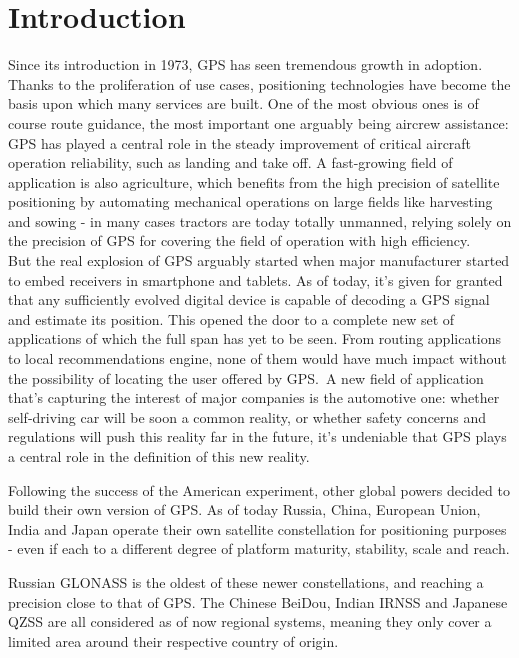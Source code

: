 \chapter{Introduction}
\label{introduction}


Since its introduction in 1973, GPS has seen tremendous growth in adoption.
Thanks to the proliferation of use cases, positioning technologies have become
the basis upon which many services are built. One of the most obvious ones is of
course route guidance, the most important one arguably being aircrew assistance:
GPS has played a central role in the steady improvement of critical aircraft
operation reliability, such as landing and take off. A fast-growing field of
application is also agriculture, which benefits from the high precision of
satellite positioning by automating mechanical operations on large fields like
harvesting and sowing - in many cases tractors are today totally unmanned,
relying solely on the precision of GPS for covering the field of operation with
high efficiency.\\
But the real explosion of GPS arguably started when major manufacturer started
to embed receivers in smartphone and tablets. As of today, it's given for
granted that any sufficiently evolved digital device is capable of decoding a
GPS signal and estimate its position. This opened the door to a complete new set
of applications of which the full span has yet to be seen. From routing
applications to local recommendations engine, none of them would have much
impact without the possibility of locating the user offered by GPS.\
A new field of application that's capturing the interest of major companies is
the automotive one: whether self-driving car will be soon a common reality, or
whether safety concerns and regulations will push this reality far in the
future, it's undeniable that GPS plays a central role in the definition of this
new reality.

Following the success of the American experiment, other global powers decided to
build their own version of GPS. As of today Russia, China, European Union, India
and Japan operate their own satellite constellation for positioning purposes -
even if each to a different degree of platform maturity, stability, scale and
reach.

Russian GLONASS is the oldest of these newer constellations, and reaching a
precision close to that of GPS. The Chinese BeiDou, Indian IRNSS and Japanese
QZSS are all considered as of now regional systems, meaning they only cover a
limited area around their respective country of origin.

